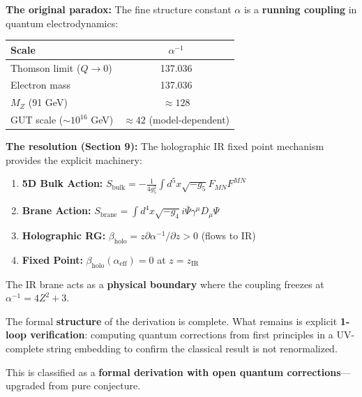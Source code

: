 \documentclass[12pt,a4paper]{article}
\newcommand{\Zsq}{Z^2}
\begin{document}
\begin{tcolorbox}[colback=green!5!white, colframe=green!60!black, title=Theoretical Resolution (v8.2.4)]
\textbf{The original paradox:} The fine structure constant $\alpha$ is a \textbf{running coupling} in quantum electrodynamics:

\begin{center}
\begin{tabular}{lc}
\toprule
\textbf{Scale} & $\alpha^{-1}$ \\
\midrule
Thomson limit ($Q \to 0$) & 137.036 \\
Electron mass & 137.036 \\
$M_Z$ (91 GeV) & $\approx 128$ \\
GUT scale ($\sim 10^{16}$ GeV) & $\approx 42$ (model-dependent) \\
\bottomrule
\end{tabular}
\end{center}

\textbf{The resolution (Section 9):} The holographic IR fixed point mechanism provides the explicit machinery:
\begin{enumerate}
    \item \textbf{5D Bulk Action:} $S_{\text{bulk}} = -\frac{1}{4g_5^2}\int d^5x\sqrt{-g_5}F_{MN}F^{MN}$
    \item \textbf{Brane Action:} $S_{\text{brane}} = \int d^4x\sqrt{-g_4}i\bar{\Psi}\gamma^\mu D_\mu\Psi$
    \item \textbf{Holographic RG:} $\beta_{\text{holo}} = z\partial\alpha^{-1}/\partial z > 0$ (flows to IR)
    \item \textbf{Fixed Point:} $\beta_{\text{holo}}(\alpha_{\text{eff}}) = 0$ at $z = z_{\text{IR}}$
\end{enumerate}

The IR brane acts as a \textbf{physical boundary} where the coupling freezes at $\alpha^{-1} = 4\Zsq + 3$.
\end{tcolorbox}

\begin{tcolorbox}[colback=yellow!10!white, colframe=orange!75!black, title=Remaining Quantum Gap]
The formal \textbf{structure} of the derivation is complete. What remains is explicit \textbf{1-loop verification}: computing quantum corrections from first principles in a UV-complete string embedding to confirm the classical result is not renormalized.

This is classified as a \textbf{formal derivation with open quantum corrections}---upgraded from pure conjecture.
\end{tcolorbox}
\end{document}
